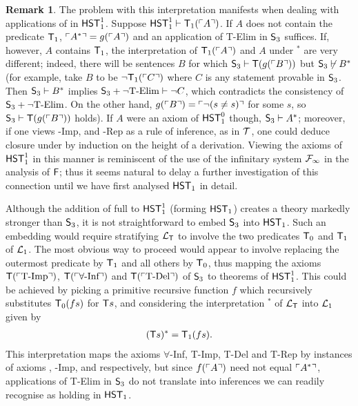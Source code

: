 \documentclass[UKenglish,cleveref,DIV=12]{scrartcl}
\theoremstyle{definition}
\theoremstyle{definition}
\newtheorem{remark}{Remark}
\begin{document}
\begin{remark}
The problem with this interpretation manifests when dealing with applications of
 in $\mathsf{HST}_1^1$. Suppose $\mathsf{HST}_1^1\vdash \mathsf{T}_1(\ulcorner{A}\urcorner)$. If $A$ does not
contain the predicate $\mathsf{T}_1$, $\ulcorner{A^*}\urcorner=g(\ulcorner{A}\urcorner)$ and an application of T-Elim
in $\mathsf{S}_3$ suffices. If, however, $A$ contains $\mathsf{T}_1$,
the interpretation of $\mathsf{T}_1(\ulcorner{A}\urcorner)$ and $A$ under $^*$ are very different;
indeed, there will be sentences $B$ for which $\mathsf{S}_3\vdash \mathsf{T}(g(\ulcorner{B}\urcorner))$
but $\mathsf{S}_3\not\vdash  B^*$ (for example, take $B$ to be $\lnot \mathsf{T}_1(\ulcorner{C}\urcorner)$ where $C$ is any statement provable in $\mathsf{S}_3$. Then $\mathsf{S}_3\vdash B^*$ implies $\mathsf{S}_3+\text{$\lnot$T-Elim}\vdash \lnot C$, which contradicts the consistency of $\mathsf{S}_3+\text{$\lnot$T-Elim}$. On the other hand, $g(\ulcorner{B}\urcorner)=\ulcorner{\lnot(s\neq s)}\urcorner$ for some $s$, so $\mathsf{S}_3\vdash \mathsf{T}(g(\ulcorner{B}\urcorner))$ holds).
If $A$ were an axiom of $\mathsf{HST}_1^0$ though, $\mathsf{S}_3\vdash A^*$; moreover, if one views -Imp,  and -Rep
as a rule of inference, as in $\mathcal{T}$, one could deduce
closure under  by induction on the height of a derivation. Viewing
the axioms of $\mathsf{HST}_1^1$ in this manner is
reminiscent of the use of the infinitary system $\mathcal{F}_\infty$ in the analysis of
$\mathsf{F}$; thus it seems natural to delay a further investigation of this connection
until we have first analysed $\mathsf{HST}_1$ in detail.

Although the addition of full  to $\mathsf{HST}_1^1$ (forming $\mathsf{HST}_1$) creates
a theory markedly stronger than $\mathsf{S}_3$, it is not straightforward to
embed $\mathsf{S}_3$ into $\mathsf{HST}_1$. Such an embedding would require stratifying
$\mathcal{L}_{\mathsf{T}}$ to involve the two predicates $\mathsf{T}_0$ and $\mathsf{T}_1$ of $\mathcal{L}_1$. The most obvious
way to proceed would appear to involve replacing the outermost predicate by
$\mathsf{T}_1$ and all others by $\mathsf{T}_0$, thus mapping the axioms $\mathsf{T}(\ulcorner{\text{T-Imp}}\urcorner)$,
$\mathsf{T}(\ulcorner{\text{$\forall$-Inf}}\urcorner)$ and $\mathsf{T}(\ulcorner{\text{T-Del}}\urcorner)$ of $\mathsf{S}_3$ to
theorems of $\mathsf{HST}_1^1$. This could be achieved by picking a primitive recursive
function $f$ which recursively substitutes $\mathsf{T}_0(f s)$ for $\mathsf{T} s$, and considering
the interpretation $^*$ of $\mathcal{L}_{\mathsf{T}}$ into $\mathcal{L}_1$ given by
\begin{align*}
 (\mathsf{T} s)^*=\mathsf{T}_1(f s).
\end{align*}
This interpretation maps the axioms $\forall$-Inf, T-Imp, T-Del and
T-Rep by instances of axioms , -Imp,  and
 respectively, but since $f(\ulcorner{A}\urcorner)$ need not equal $\ulcorner{A^*}\urcorner$,
applications of T-Elim in $\mathsf{S}_3$ do not translate into inferences we can
readily recognise as holding in $\mathsf{HST}_1$.
\end{remark}
\end{document}
